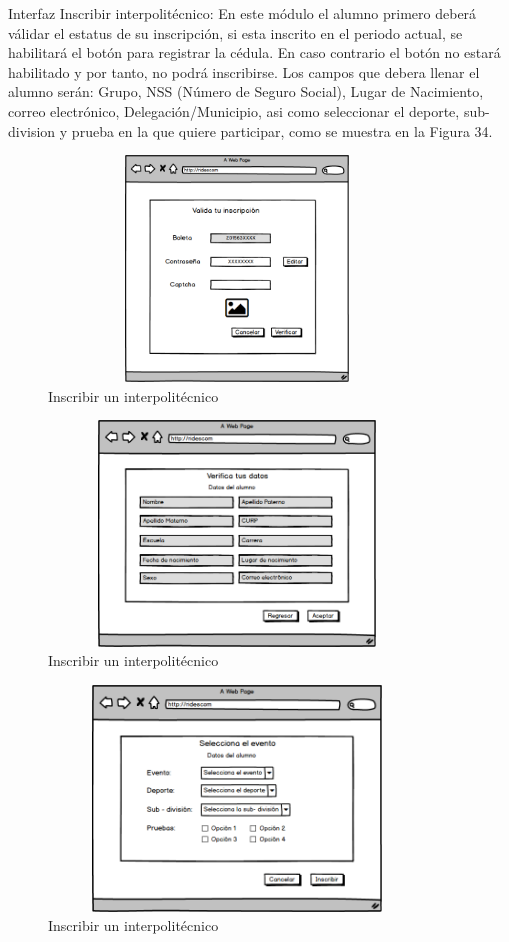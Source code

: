 	\noindent Interfaz Inscribir interpolitécnico: En este módulo el alumno primero deberá válidar el estatus de su inscripción, si esta inscrito en el periodo actual, se habilitará el botón para registrar la cédula. En caso contrario el botón no estará habilitado y por tanto, no podrá inscribirse. Los campos que debera llenar el alumno serán: Grupo, NSS (Número de Seguro Social), Lugar de Nacimiento, correo electrónico, Delegación/Municipio, asi como seleccionar el deporte, sub-division y prueba en la que quiere participar, como se muestra en la Figura 34.
	\begin{figure}[hbt!]
		\centering
		\includegraphics[width=10cm, height=6cm]{Imagenes/Disenos/p15InscripcionInterpolitecnico1.png}
		\caption{Inscribir un interpolitécnico}
	\end{figure}

	\begin{figure}[hbt!]
	\centering
	\includegraphics[width=10cm, height=6cm]{Imagenes/Disenos/p16InscripcionInterpolitecnico2.png}
	\caption{Inscribir un interpolitécnico}
	\end{figure}

	\begin{figure}[hbt!]
	\centering
	\includegraphics[width=10cm, height=6cm]{Imagenes/Disenos/p17InscripcionInterpolitecnico3.png}
	\caption{Inscribir un interpolitécnico}
	\end{figure}
	\pagebreak
	
